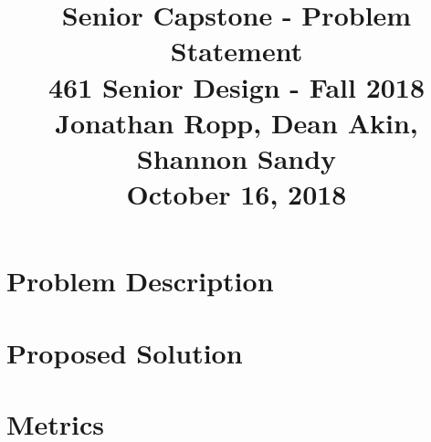 \documentclass[onecolumn, draftclsnofoot,10pt, compsoc]{IEEEtran}
\begin{document}
\title{Senior Capstone - Problem Statement\\
	\large 461 Senior Design - Fall 2018\\
	\large Jonathan Ropp, Dean Akin, Shannon Sandy\\
	\large October 16, 2018}

\maketitle

\begin{abstract}
\end{abstract}

\section{Problem Description}


\section{Proposed Solution}


\section{Metrics}
\end{document}
